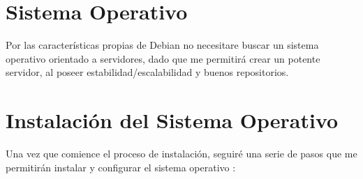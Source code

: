 	\section{Sistema Operativo}
				
			Por las características propias de Debian no necesitare buscar un sistema operativo orientado a 	servidores, dado que me permitirá crear un potente servidor, al poseer estabilidad/escalabilidad y buenos repositorios.\par
		
	\section{Instalación del Sistema Operativo}\label{install}
			
		Una vez que comience el proceso de instalación, seguiré una serie de pasos que me permitirán instalar y configurar el sistema operativo :
		

